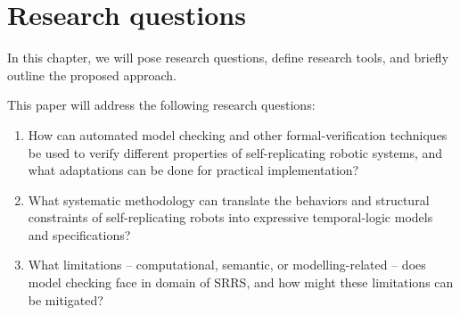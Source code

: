 
\chapter{Research questions} \label{research_questions}

In this chapter, we will pose research questions, define research tools, and briefly outline the proposed approach.

This paper will address the following research questions:
\begin{enumerate}
    \item How can automated model checking and other formal-verification 
        techniques be used to verify different properties of 
        self-replicating robotic systems, and what adaptations 
        can be done for practical implementation?
    \item What systematic methodology can translate the behaviors and 
        structural constraints of self-replicating robots into expressive 
        temporal-logic models and specifications?
    \item What limitations -- computational, semantic, or 
        modelling-related -- does model checking face in domain of SRRS,
        and how might these limitations can be mitigated?\\


\end{enumerate}


